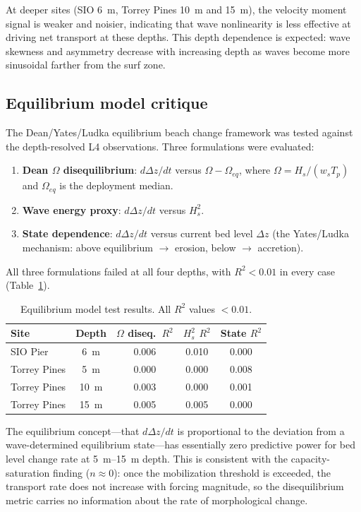 At deeper sites (SIO \SI{6}{\meter}, Torrey Pines \SI{10}{\meter}
and \SI{15}{\meter}), the velocity moment signal is weaker and
noisier, indicating that wave nonlinearity is less effective at
driving net transport at these depths. This depth dependence is
expected: wave skewness and asymmetry decrease with increasing
depth as waves become more sinusoidal farther from the surf zone.

\subsection{Equilibrium model critique}

The Dean/Yates/Ludka equilibrium beach change framework was tested
against the depth-resolved L4 observations. Three formulations were
evaluated:

\begin{enumerate}
  \item \textbf{Dean $\Omega$ disequilibrium}: $d\Delta z/dt$ versus
    $\Omega - \Omega_{eq}$, where $\Omega = H_s / (w_s T_p)$ and
    $\Omega_{eq}$ is the deployment median.
  \item \textbf{Wave energy proxy}: $d\Delta z/dt$ versus $H_s^2$.
  \item \textbf{State dependence}: $d\Delta z/dt$ versus current bed
    level $\Delta z$ (the Yates/Ludka mechanism: above equilibrium
    $\rightarrow$ erosion, below $\rightarrow$ accretion).
\end{enumerate}

All three formulations failed at all four depths, with $R^2 < 0.01$
in every case (Table~\ref{tab:equilibrium}).

\begin{table}[h]
\centering
\caption{Equilibrium model test results. All $R^2$ values $< 0.01$.}
\label{tab:equilibrium}
\begin{tabular}{lcccc}
\toprule
Site & Depth & $\Omega$ diseq.\ $R^2$ & $H_s^2$ $R^2$ & State $R^2$ \\
\midrule
SIO Pier & 6~m & 0.006 & 0.010 & 0.000 \\
Torrey Pines & 5~m & 0.000 & 0.000 & 0.008 \\
Torrey Pines & 10~m & 0.003 & 0.000 & 0.001 \\
Torrey Pines & 15~m & 0.005 & 0.005 & 0.000 \\
\bottomrule
\end{tabular}
\end{table}

The equilibrium concept---that $d\Delta z/dt$ is proportional to the
deviation from a wave-determined equilibrium state---has essentially
zero predictive power for bed level change rate at \SIrange{5}{15}{\meter}
depth. This is consistent with the capacity-saturation finding
($n \approx 0$): once the mobilization threshold is exceeded, the
transport rate does not increase with forcing magnitude, so the
disequilibrium metric carries no information about the rate of
morphological change.

